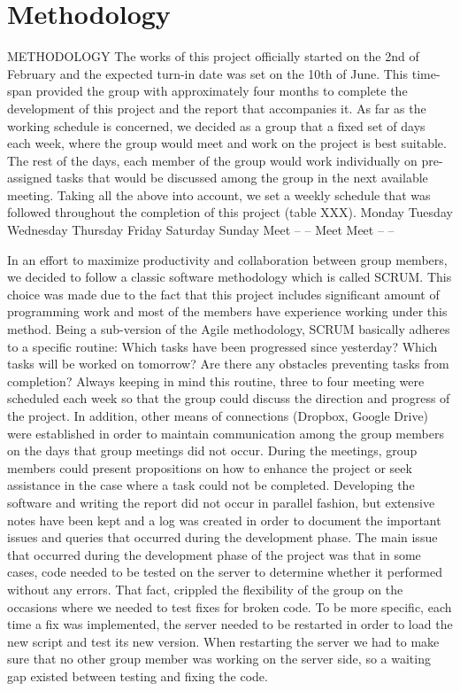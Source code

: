 
\chapter{Methodology} %

\label{ch:theory} %

METHODOLOGY
The works of this project officially started on the 2nd of February and the expected turn-in date was set on the 10th of June. This time-span provided the group with approximately four months to complete the development of this project and the report that accompanies it.
As far as the working schedule is concerned, we decided as a group that a fixed set of days each week, where the group would meet and work on the project is best suitable. The rest of the days, each member of the group would work individually on pre-assigned tasks that would be discussed among the group in the next available meeting. Taking all the above into account, we set a weekly schedule that was followed throughout the completion of this project (table XXX).
Monday 
Tuesday
Wednesday
Thursday
Friday
Saturday
Sunday
Meet
--
--
Meet
Meet
--
--

In an effort to maximize productivity and collaboration between group members, we decided to follow a classic software methodology which is called SCRUM. This choice was made due to the fact that this project includes significant amount of programming work and most of the members have experience working under this method. 
Being a sub-version of the Agile methodology, SCRUM basically adheres to a specific routine:
Which tasks have been progressed since yesterday?
Which tasks will be worked on tomorrow?
Are there any obstacles preventing tasks from completion?
Always keeping in mind this routine, three to four meeting were scheduled each week so that the group could discuss the direction and progress of the project. In addition, other means of connections (Dropbox, Google Drive) were established in order to maintain communication among the group members on the days that group meetings did not occur. During the meetings, group members could present propositions on how to enhance the project or seek assistance in the case where a task could not be completed.
Developing the software and writing the report did not occur in parallel fashion, but extensive notes have been kept and a log was created in order to document the important issues and queries that occurred during the development phase.
The main issue that occurred during the development phase of the project was that in some cases, code needed to be tested on the server to determine whether it performed without any errors. That fact, crippled the flexibility of the group on the occasions where we needed to test fixes for broken code. To be more specific, each time a fix was implemented, the server needed to be restarted in order to load the new script and test its new version. When restarting the server we had to make sure that no other group member was working on the server side, so a waiting gap existed between testing and fixing the code.


